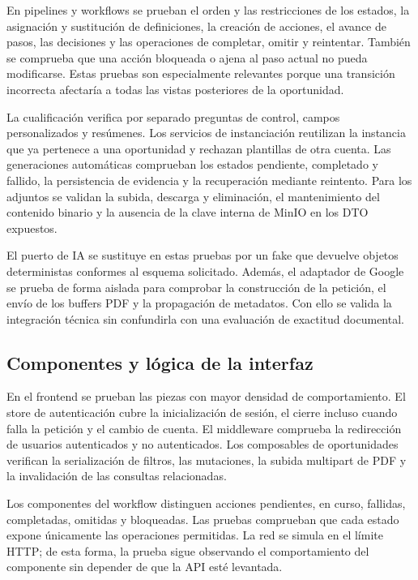 En pipelines y workflows se prueban el orden y las restricciones de los
estados, la asignación y sustitución de definiciones, la creación de acciones,
el avance de pasos, las decisiones y las operaciones de completar, omitir y
reintentar. También se comprueba que una acción bloqueada o ajena al paso
actual no pueda modificarse. Estas pruebas son especialmente relevantes
porque una transición incorrecta afectaría a todas las vistas posteriores de
la oportunidad.

La cualificación verifica por separado preguntas de control, campos
personalizados y resúmenes. Los servicios de instanciación reutilizan la
instancia que ya pertenece a una oportunidad y rechazan plantillas de otra
cuenta. Las generaciones automáticas comprueban los estados pendiente,
completado y fallido, la persistencia de evidencia y la recuperación mediante
reintento. Para los adjuntos se validan la subida, descarga y eliminación, el
mantenimiento del contenido binario y la ausencia de la clave interna de
MinIO en los DTO expuestos.

El puerto de IA se sustituye en estas pruebas por un fake que devuelve objetos
deterministas conformes al esquema solicitado. Además, el adaptador de Google
se prueba de forma aislada para comprobar la construcción de la petición, el
envío de los buffers PDF y la propagación de metadatos. Con ello se valida la
integración técnica sin confundirla con una evaluación de exactitud documental.

\subsection{Componentes y lógica de la interfaz}

En el frontend se prueban las piezas con mayor densidad de comportamiento. El
store de autenticación cubre la inicialización de sesión, el cierre incluso
cuando falla la petición y el cambio de cuenta. El middleware comprueba la
redirección de usuarios autenticados y no autenticados. Los composables de
oportunidades verifican la serialización de filtros, las mutaciones, la subida
multipart de PDF y la invalidación de las consultas relacionadas.

Los componentes del workflow distinguen acciones pendientes, en curso,
fallidas, completadas, omitidas y bloqueadas. Las pruebas comprueban que cada
estado expone únicamente las operaciones permitidas. La red se simula en el
límite HTTP; de esta forma, la prueba sigue observando el comportamiento del
componente sin depender de que la API esté levantada.

